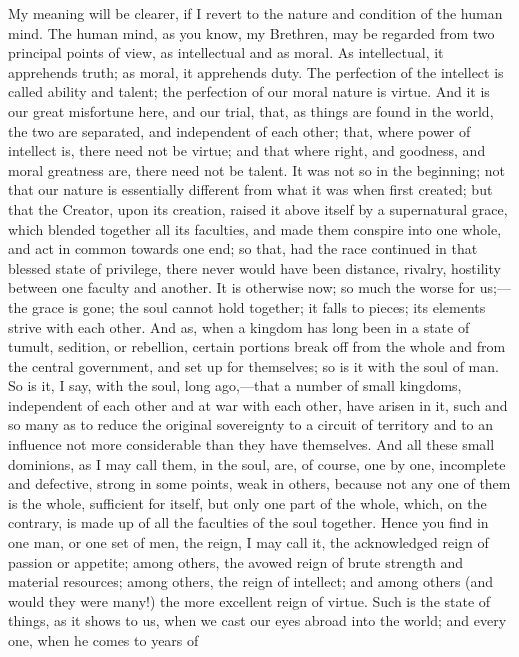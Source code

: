 My meaning will be clearer, if I revert to the nature
and condition of the human mind. The human mind, as you
know, my Brethren, may be regarded from two principal
points of view, as intellectual and as moral. As
intellectual, it apprehends truth; as moral, it
apprehends duty. The perfection of the intellect is
called ability and talent; the perfection of our moral
nature is virtue. And it is our great misfortune here,
and our trial, that, as things are found in the world,
the two are separated, and independent of each other;
that, where power of intellect is, there need not be
virtue; and that where right, and goodness, and moral
greatness are, there need not be talent. It was not so in
the beginning; not that our nature is essentially
different from what it was when first created; but that
the Creator, upon its creation, raised it above itself by
a supernatural grace, which blended together all its
faculties, and made them conspire into one whole, and act
in common towards one end; so that, had the race
continued in that blessed state of privilege, there never
would have been distance, rivalry, hostility between one
faculty and another. It is otherwise now; so much the
worse for us;—the grace is gone; the soul cannot
hold together; it falls to pieces; its elements strive
with each other. And as, when a kingdom has long been in
a state of tumult, sedition, or rebellion, certain
portions break off from the whole and from the central
government, and set up for themselves; so is it with the soul of man. So is it, I say, with the soul, long
ago,—that a number of small kingdoms, independent of
each other and at war with each other, have arisen in it,
such and so many as to reduce the original sovereignty to
a circuit of territory and to an influence not more
considerable than they have themselves. And all these
small dominions, as I may call them, in the soul, are, of
course, one by one, incomplete and defective, strong in
some points, weak in others, because not any one of them
is the whole, sufficient for itself, but only one part of
the whole, which, on the contrary, is made up of all the
faculties of the soul together. Hence you find in one
man, or one set of men, the reign, I may call it, the
acknowledged reign of passion or appetite; among others,
the avowed reign of brute strength and material
resources; among others, the reign of intellect; and
among others (and would they were many!) the more
excellent reign of virtue. Such is the state of things,
as it shows to us, when we cast our eyes abroad into the
world; and every one, when he comes to years of
